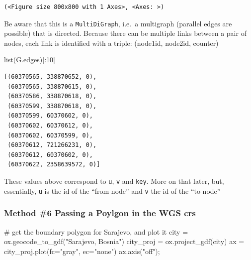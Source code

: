 \documentclass[
  letterpaper,
  DIV=11,
  numbers=noendperiod]{scrreprt}
\newenvironment{Shaded}{\begin{snugshade}}{\end{snugshade}}
\newcommand{\BuiltInTok}[1]{\textcolor[rgb]{0.00,0.23,0.31}{#1}}
\newcommand{\CommentTok}[1]{\textcolor[rgb]{0.37,0.37,0.37}{#1}}
\newcommand{\DecValTok}[1]{\textcolor[rgb]{0.68,0.00,0.00}{#1}}
\newcommand{\NormalTok}[1]{\textcolor[rgb]{0.00,0.23,0.31}{#1}}
\newcommand{\OperatorTok}[1]{\textcolor[rgb]{0.37,0.37,0.37}{#1}}
\newcommand{\StringTok}[1]{\textcolor[rgb]{0.13,0.47,0.30}{#1}}
\begin{document}
\begin{verbatim}
(<Figure size 800x800 with 1 Axes>, <Axes: >)
\end{verbatim}

Be aware that this is a \texttt{MultiDiGraph}, i.e.~a multigraph
(parallel edges are possible) that is directed. Because there can be
multiple links between a pair of nodes, each link is identified with a
triple: (node1id, node2id, counter)

\begin{Shaded}
\begin{Highlighting}[]
\BuiltInTok{list}\NormalTok{(G.edges)[:}\DecValTok{10}\NormalTok{]}
\end{Highlighting}
\end{Shaded}

\begin{verbatim}
[(60370565, 338870652, 0),
 (60370565, 338870615, 0),
 (60370586, 338870618, 0),
 (60370599, 338870618, 0),
 (60370599, 60370602, 0),
 (60370602, 60370612, 0),
 (60370602, 60370599, 0),
 (60370612, 721266231, 0),
 (60370612, 60370602, 0),
 (60370622, 2358639572, 0)]
\end{verbatim}

These values above correspond to \texttt{u}, \texttt{v} and
\texttt{key}. More on that later, but, essentially, \texttt{u} is the id
of the ``from-node'' and \texttt{v} the id of the ``to-node''

\hypertarget{method-6-passing-a-poylgon-in-the-wgs-crs}{%
\subsubsection{Method \#6 Passing a Poylgon in the WGS
crs}\label{method-6-passing-a-poylgon-in-the-wgs-crs}}

\begin{Shaded}
\begin{Highlighting}[]
\CommentTok{\# get the boundary polygon for Sarajevo, and plot it}
\NormalTok{city }\OperatorTok{=}\NormalTok{ ox.geocode\_to\_gdf(}\StringTok{"Sarajevo, Bosnia"}\NormalTok{)}
\NormalTok{city\_proj }\OperatorTok{=}\NormalTok{ ox.project\_gdf(city)}
\NormalTok{ax }\OperatorTok{=}\NormalTok{ city\_proj.plot(fc}\OperatorTok{=}\StringTok{"gray"}\NormalTok{, ec}\OperatorTok{=}\StringTok{"none"}\NormalTok{)}
\NormalTok{ax.axis(}\StringTok{"off"}\NormalTok{)}\OperatorTok{;}
\end{Highlighting}
\end{Shaded}
\end{document}
